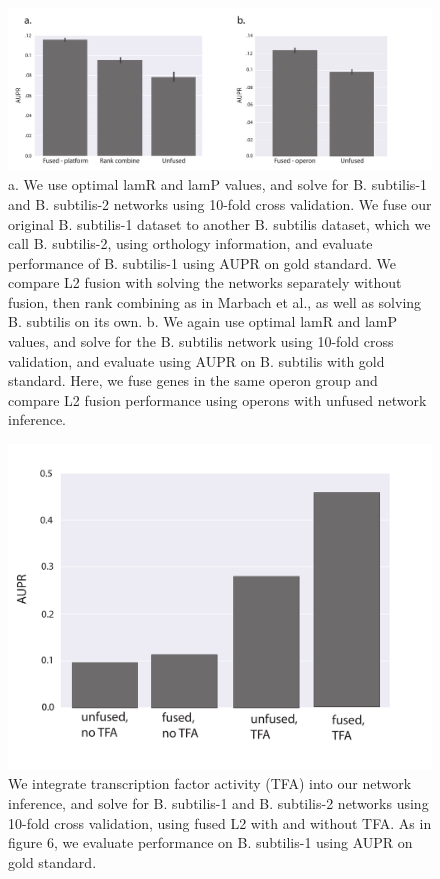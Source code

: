 \documentclass[11pt]{article}
\begin{document}
\begin{figure}
\begin{center}
  \includegraphics[scale=0.45]{fig6.pdf}
  \caption{\label{fusedl2-real} a. We use optimal lamR and lamP values, and solve for B. subtilis-1 and B. subtilis-2 networks using 10-fold cross validation. We fuse our original B. subtilis-1 dataset to another B. subtilis dataset, which we call B. subtilis-2, using orthology information, and evaluate performance of B. subtilis-1 using AUPR on gold standard. We compare L2 fusion with solving the networks separately without fusion, then rank combining as in Marbach et al., as well as solving B. subtilis on its own. b. We again use optimal lamR and lamP values, and solve for the B. subtilis network using 10-fold cross validation, and evaluate using AUPR on B. subtilis with gold standard. 
  Here, we fuse genes in the same operon group and compare L2 fusion performance using operons with unfused network inference.}
\end{center}
\end{figure}

\begin{figure}
\begin{center}
  \includegraphics[scale=0.45]{fig7.pdf}
  \caption{\label{tfa} We integrate transcription factor activity (TFA) into our network inference, and solve for B. subtilis-1 and B. subtilis-2 networks using 10-fold cross validation, using fused L2 with and without TFA. As in figure 6, we evaluate performance on B. subtilis-1 using AUPR on gold standard.}
\end{center}
\end{figure}
\end{document}
